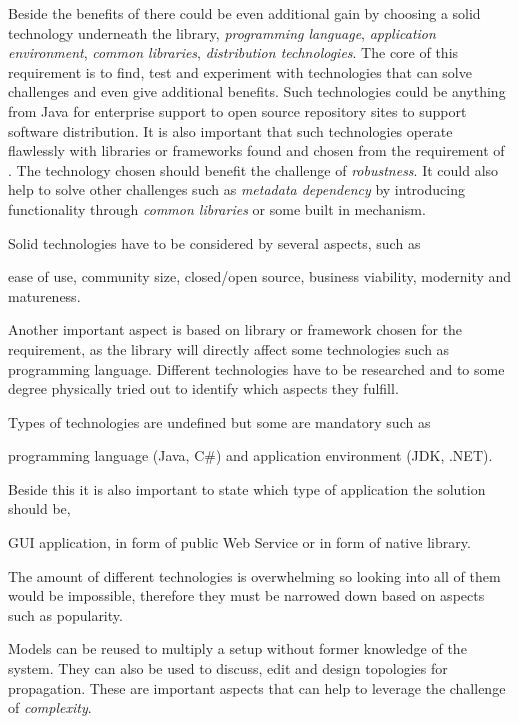 Beside the benefits of  there could be even additional gain by choosing
a solid technology underneath the library, \eg \emph{programming language},
\emph{application environment}, \emph{common libraries}, \emph{distribution technologies}.
The core of this requirement is to find, test and experiment with technologies that can solve
challenges and even give additional benefits.
Such technologies could be anything from Java for enterprise support to open source repository
sites to support software distribution.
It is also important that such technologies operate flawlessly with libraries or frameworks
found and chosen from the requirement of .
The technology chosen should benefit the challenge of \emph{robustness}.
It could also help to solve other challenges such as \emph{metadata dependency} by introducing
functionality through \emph{common libraries} or some built in mechanism.

Solid technologies have to be considered by several aspects, such as
\begin{ii}
  \iitem ease of use,
  \iitem community size,
  \iitem closed/open source,
  \iitem business viability,
  \iitem modernity and 
  \iitem matureness.
\end{ii}
Another important aspect is based on library or framework chosen for the  requirement,
as the library will directly affect some technologies such as programming language.
Different technologies have to be researched and to some degree physically tried out to identify
which aspects they fulfill.

Types of technologies are undefined but some are mandatory such as 
\begin{ii}
  \iitem programming language (Java, C\#) and 
  \iitem application environment (JDK, .NET).
\end{ii}
Beside this it is also important to state which type of application the solution should be, 
\begin{ii}
  \iitem GUI application,
  \iitem {} in form of public Web Service or
  \iitem {} in form of native library.
\end{ii}
The amount of different technologies is overwhelming so looking into all of them would be impossible,
therefore they must be narrowed down based on aspects such as popularity.

Models can be reused to multiply a setup without former knowledge of the system.
They can also be used to discuss, edit and design topologies for propagation. 
These are important aspects that can help to leverage the challenge of \emph{complexity}.

